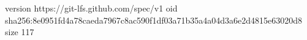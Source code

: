version https://git-lfs.github.com/spec/v1
oid sha256:8e0951fd4a78caeda7967c8ac590f1df03a71b35a4a04d3a6e2d4815e63020d8
size 117
